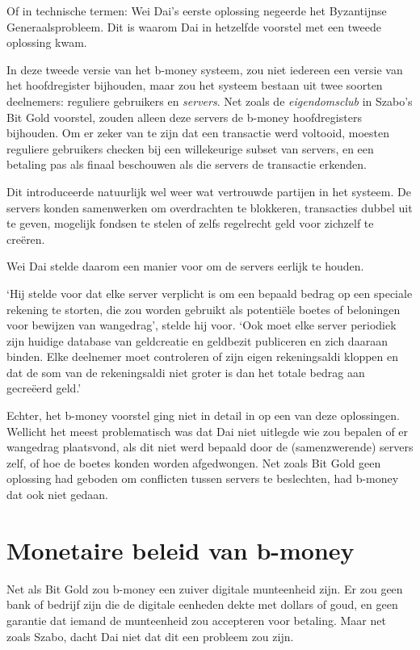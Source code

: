 \documentclass[
  a5paper,
  smalldemyvopaper,11pt,twoside,onecolumn,openright,extrafontsizes,
hidelinks]{memoir}
\begin{document}
Of in technische termen: Wei Dai's eerste oplossing negeerde het
Byzantijnse Generaalsprobleem. Dit is waarom Dai in hetzelfde voorstel
met een tweede oplossing kwam.

In deze tweede versie van het b-money systeem, zou niet iedereen een
versie van het hoofdregister bijhouden, maar zou het systeem bestaan uit
twee soorten deelnemers: reguliere gebruikers en \emph{servers}. Net
zoals de \emph{eigendomsclub} in Szabo's Bit Gold voorstel, zouden
alleen deze servers de b-money hoofdregisters bijhouden. Om er zeker van
te zijn dat een transactie werd voltooid, moesten reguliere gebruikers
checken bij een willekeurige subset van servers, en een betaling pas als
finaal beschouwen als die servers de transactie erkenden.

Dit introduceerde natuurlijk wel weer wat vertrouwde partijen in het
systeem. De servers konden samenwerken om overdrachten te blokkeren,
transacties dubbel uit te geven, mogelijk fondsen te stelen of zelfs
regelrecht geld voor zichzelf te creëren.

Wei Dai stelde daarom een manier voor om de servers eerlijk te houden.

`Hij stelde voor dat elke server verplicht is om een bepaald bedrag op
een speciale rekening te storten, die zou worden gebruikt als potentiële
boetes of beloningen voor bewijzen van wangedrag', stelde hij voor. `Ook
moet elke server periodiek zijn huidige database van geldcreatie en
geldbezit publiceren en zich daaraan binden. Elke deelnemer moet
controleren of zijn eigen rekeningsaldi kloppen en dat de som van de
rekeningsaldi niet groter is dan het totale bedrag aan gecreëerd geld.'

Echter, het b-money voorstel ging niet in detail in op een van deze
oplossingen. Wellicht het meest problematisch was dat Dai niet uitlegde
wie zou bepalen of er wangedrag plaatsvond, als dit niet werd bepaald
door de (samenzwerende) servers zelf, of hoe de boetes konden worden
afgedwongen. Net zoals Bit Gold geen oplossing had geboden om conflicten
tussen servers te beslechten, had b-money dat ook niet gedaan.

\section{Monetaire beleid van
b-money}\label{monetaire-beleid-van-b-money}

Net als Bit Gold zou b-money een zuiver digitale munteenheid zijn. Er
zou geen bank of bedrijf zijn die de digitale eenheden dekte met dollars
of goud, en geen garantie dat iemand de munteenheid zou accepteren voor
betaling. Maar net zoals Szabo, dacht Dai niet dat dit een probleem zou
zijn.
\end{document}
